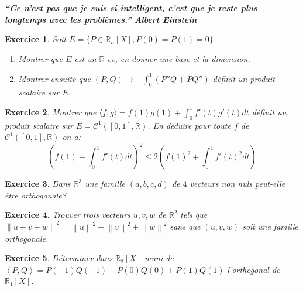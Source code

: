 \documentclass[12pt,a4paper]{article}
\newcommand{\norme}[1]{\left\lVert#1\right\rVert}
\newcommand{\ps}[2]{\left\langle#1,#2\right\rangle}
\newcommand{\R}{\mathbb{R}}
\theoremstyle{break}
\newtheorem{Exo}{Exercice}
\begin{document}
\emph{\textbf{
“Ce n'est pas que je suis si intelligent, c'est que je reste plus longtemps avec les problèmes.” 
Albert Einstein
}}


\begin{Exo}
	Soit $E=\{P\in\R_n[X],P(0)=P(1)=0\}$
	\begin{enumerate}
		\item
		Montrer que $E$ est un $\R$-ev, en donner une base et la dimension.
		\item
		Montrer ensuite que $(P,Q)\mapsto -\int_0^1(P''Q+PQ'')$ définit un produit scalaire sur $E$.
	\end{enumerate}
\end{Exo}



\begin{Exo}
Montrer que
$\langle f,g\rangle=f(1)g(1)+\int_0^1 f'(t)g'(t)dt$ définit un produit scalaire sur $E=\mathcal C^1([0,1],\mathbb R)$. En déduire pour toute $f$ de $\mathcal C^1([0,1],\mathbb R)$ on a:
$$\left(f(1)+\int_0^1 f'(t)dt\right)^2\leqslant 2\left(f(1)^2+\int_0^1f'(t)^2dt\right)$$
\end{Exo}


\begin{Exo}
Dans $\R^3$ une famille $(a,b,c,d)$ de $4$ vecteurs non nuls peut-elle être orthogonale? 
\end{Exo}

\begin{Exo}
	Trouver trois vecteurs $u,v,w$  de $\R^2$ tels que $\norme{u+v+w}^2=\norme{u}^2+\norme{v}^2+\norme{w}^2$ sans que $(u,v,w)$ soit une famille orthogonale.
\end{Exo}

\begin{Exo}
Déterminer dans $\R_2[X]$ muni de $\ps{P}{Q}=P(-1)Q(-1)+P(0)Q(0)+P(1)Q(1)$ l'orthogonal de $\R_1[X]$.
\end{Exo}
\end{document}
